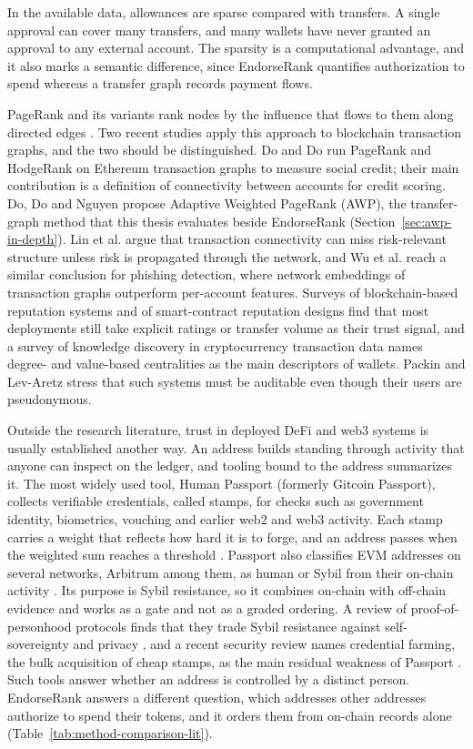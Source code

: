 In the available data, allowances are sparse compared with transfers. A single approval can cover many transfers, and many wallets have never granted an approval to any external account. The sparsity is a computational advantage, and it also marks a semantic difference, since EndorseRank quantifies authorization to spend whereas a transfer graph records payment flows.


PageRank and its variants rank nodes by the influence that flows to them along directed edges . Two recent studies apply this approach to blockchain transaction graphs, and the two should be distinguished. Do and Do run PageRank and HodgeRank on Ethereum transaction graphs to measure social credit; their main contribution is a definition of connectivity between accounts for credit scoring. Do, Do and Nguyen propose Adaptive Weighted PageRank (AWP), the transfer-graph method that this thesis evaluates beside EndorseRank (Section~\ref{sec:awp-in-depth}). Lin et al. argue that transaction connectivity can miss risk-relevant structure unless risk is propagated through the network, and Wu et al. reach a similar conclusion for phishing detection, where network embeddings of transaction graphs outperform per-account features. Surveys of blockchain-based reputation systems  and of smart-contract reputation designs  find that most deployments still take explicit ratings or transfer volume as their trust signal, and a survey of knowledge discovery in cryptocurrency transaction data  names degree- and value-based centralities as the main descriptors of wallets. Packin and Lev-Aretz stress that such systems must be auditable even though their users are pseudonymous.

Outside the research literature, trust in deployed DeFi and web3 systems is usually established another way. An address builds standing through activity that anyone can inspect on the ledger, and tooling bound to the address summarizes it. The most widely used tool, Human Passport (formerly Gitcoin Passport), collects verifiable credentials, called stamps, for checks such as government identity, biometrics, vouching and earlier web2 and web3 activity. Each stamp carries a weight that reflects how hard it is to forge, and an address passes when the weighted sum reaches a threshold . Passport also classifies EVM addresses on several networks, Arbitrum among them, as human or Sybil from their on-chain activity . Its purpose is Sybil resistance, so it combines on-chain with off-chain evidence and works as a gate and not as a graded ordering. A review of proof-of-personhood protocols finds that they trade Sybil resistance against self-sovereignty and privacy , and a recent security review names credential farming, the bulk acquisition of cheap stamps, as the main residual weakness of Passport . Such tools answer whether an address is controlled by a distinct person. EndorseRank answers a different question, which addresses other addresses authorize to spend their tokens, and it orders them from on-chain records alone (Table~\ref{tab:method-comparison-lit}).

